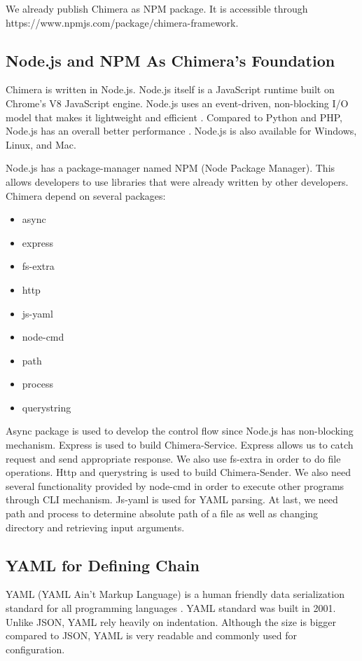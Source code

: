 \documentclass[conference]{IEEEtran}
\begin{document}
We already publish Chimera as NPM package. It is accessible through 
https://www.npmjs.com/package/chimera-framework.


\subsection{Node.js and NPM As Chimera's Foundation}

Chimera is written in Node.js. Node.js itself is a JavaScript runtime built on Chrome's 
V8 JavaScript engine. Node.js uses an event-driven, non-blocking I/O model that makes it 
lightweight and efficient \cite{nodejs}. Compared to Python and PHP, Node.js has an 
overall better performance \cite{lei2014performance}. Node.js is also available for
Windows, Linux, and Mac.

Node.js has a package-manager named NPM (Node Package Manager). This allows developers
to use libraries that were already written by other developers. Chimera depend on 
several packages:

\begin{itemize}
    \item async
    \item express
    \item fs-extra
    \item http
    \item js-yaml
    \item node-cmd
    \item path
    \item process
    \item querystring
\end{itemize}

Async package is used to develop the control flow since Node.js has non-blocking
mechanism. Express is used to build Chimera-Service. Express allows us to catch request
and send appropriate response. We also use fs-extra in order to do file operations.
Http and querystring is used to build Chimera-Sender. We also need several functionality
provided by node-cmd in order to execute other programs through CLI mechanism.
Js-yaml is used for YAML parsing. At last, we need path and process to determine 
absolute path of a file as well as changing directory and retrieving input arguments.

\subsection{YAML for Defining Chain}

YAML (YAML Ain't Markup Language) is a human friendly data serialization standard for 
all programming languages \cite{yaml}. YAML standard was built in 2001. Unlike JSON,
YAML rely heavily on indentation. Although the size is bigger compared to JSON, YAML
is very readable and commonly used for configuration.
\end{document}
